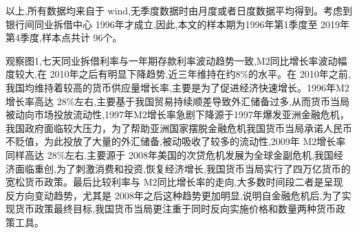 \documentclass{ijclclp}
\begin{document}
以上,所有数据均来自于 wind,无季度数据时由月度或者日度数据平均得到。考虑到银行间同业拆借中心 1996年才成立,因此,本文的样本期为1996年第1季度至 2019年第4季度,样本点共计 96个。

观察图1,七天同业拆借利率与一年期存款利率波动趋势一致,M2同比增长率波动幅度较大,在 2010年之后有明显下降趋势,近三年维持在约8\%的水平。在 2010年之前,我国均维持着较高的货币供应量增长率,主要是为了促进经济快速增长。1996年M2增长率高达 28\%左右,主要基于我国贸易持续顺差导致外汇储备过多,从而货币当局被动向市场投放流动性,1997年M2增长率急剧下降源于1997年爆发亚洲金融危机，我国政府面临较大压力，为了帮助亚洲国家摆脱金融危机我国货币当局承诺人民币不贬值，为此投放了大量的外汇储备,被动吸收了较多的流动性,2009年 M2增长率同样高达 28\%左右,主要源于 2008年美国的次贷危机发展为全球金副危机,我国经济面临重创,为了刺激消费和投资,恢复经济增长,我国货币当局实行了四万亿货币的宽松货币政策。最后比较利率与 M2同比增长率的走向,大多数时间段二者是呈现反方向变动趋势，尤其是 2008年之后这种趋势更加明显,说明自金融危机后,为了实现货币政策最终目标,我国货币当局更注重于同时反向实施价格和数量两种货币政策工具。
\end{document}
